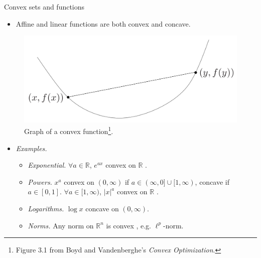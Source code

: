 \documentclass{beamer}
\numberwithin{equation}{section}
\begin{document}
\begin{frame}{Convex sets and functions}
    \begin{itemize}
        \item
        Affine and linear functions are both convex and concave.
    \end{itemize}
    \begin{figure}
        \centering
        \vspace{-3 pt}
        \includegraphics[scale = 0.24]{bv_fig_3.1.png}
        \vspace{-5 pt}
        \caption{Graph of a convex function\footnote{
            Figure 3.1 from Boyd and Vandenberghe's
            \textit{Convex Optimization}.
        }. }
        \vspace{-10 pt}
    \end{figure}
    \begin{itemize}
        \item
        \textit{Examples.}
        \begin{itemize}
            \item
            \textit{Exponential.} $ \forall a \in \mathbb{R} $, $ e^{ax} $
            convex on $ \mathbb{R} $ \cite{bv_convex_opt}.

            \item
            \textit{Powers.} $ x^a $ convex on $ (0, \infty) $ if
            $ a \in (\infty, 0] \cup [1, \infty) $, concave if
            $ a \in [0, 1] $. $ \forall a \in [1, \infty) $, $ |x|^a $ convex
            on $ \mathbb{R} $ \cite{bv_convex_opt}.

            \item
            \textit{Logarithms.} $ \log x $ concave on $ (0, \infty) $.

            \item
            \textit{Norms.} Any norm on $ \mathbb{R}^n $ is convex
            \cite{bv_convex_opt}, e.g. $ \ell^p $-norm.
        \end{itemize}
    \end{itemize}

    \bigskip
\end{frame}
\end{document}
